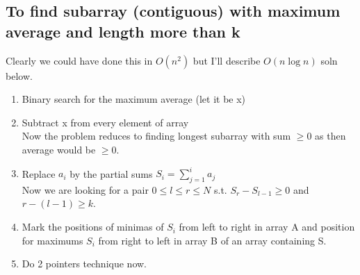 \documentclass[8pt, a4paper, oneside, twocolumn]{extarticle}
\begin{document}
\subsection{To find subarray (contiguous) with maximum average and length more than \textbf{k}}
Clearly we could have done this in $O(n^2)$ but I'll describe $O(n \log n)$ soln below.
\begin{enumerate}
    \item Binary search for the maximum average (let it be x)
    \item Subtract x from every element of array
\\Now the problem reduces to finding longest subarray with sum $\geq 0$ as then average would be $\geq 0$.
    \item Replace $a_i$ by the partial sums $S_i = \sum_{j = 1}^i a_j$\\
Now we are looking for a pair $0 \leq l \leq r \leq N$ s.t. $S_r - S_{l - 1} \geq 0$ and $r - (l - 1) \geq k$.
    \item Mark the positions of minimas of $S_i$ from left to right in array A and position for maximums $S_i$ from right to left in array B of an array containing S.
    \item Do 2 pointers technique now.
\end{enumerate}
\end{document}
